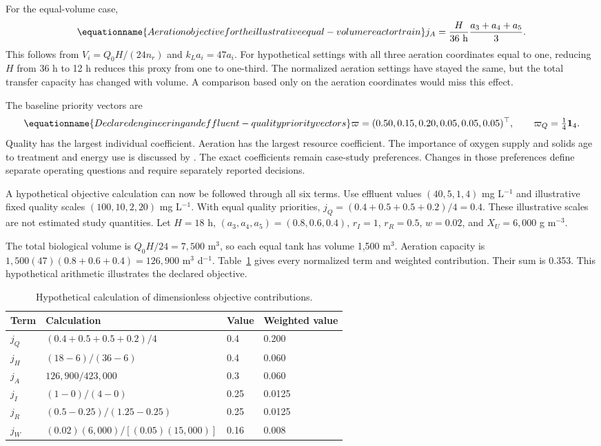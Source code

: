 For the equal-volume case,
\begin{equation}
\equationname{Aeration objective for the illustrative equal-volume reactor train}
j_A=\frac{H}{36\ \mathrm{h}}\frac{a_3+a_4+a_5}{3}.
\label{eq:plant_aeration_proxy_example}
\end{equation}
This follows from $V_i=Q_0H/(24n_r)$ and $k_La_i=47a_i$. For hypothetical settings with all three aeration coordinates equal to one, reducing $H$ from 36 h to 12 h reduces this proxy from one to one-third. The normalized aeration settings have stayed the same, but the total transfer capacity has changed with volume. A comparison based only on the aeration coordinates would miss this effect.

The baseline priority vectors are
\begin{equation}
\equationname{Declared engineering and effluent-quality priority vectors}
\varpi=(0.50,0.15,0.20,0.05,0.05,0.05)^\top,\qquad
\varpi_Q=\tfrac14\mathbf1_4.
\label{eq:plant_objective_priorities}
\end{equation}
Quality has the largest individual coefficient. Aeration has the largest resource coefficient. The importance of oxygen supply and solids age to treatment and energy use is discussed by \citet{Leu2012}. The exact coefficients remain case-study preferences. Changes in those preferences define separate operating questions and require separately reported decisions.

A hypothetical objective calculation can now be followed through all six terms. Use effluent values $(40,5,1,4)$ mg L$^{-1}$ and illustrative fixed quality scales $(100,10,2,20)$ mg L$^{-1}$. With equal quality priorities, $j_Q=(0.4+0.5+0.5+0.2)/4=0.4$. These illustrative scales are not estimated study quantities. Let $H=18$ h, $(a_3,a_4,a_5)=(0.8,0.6,0.4)$, $r_I=1$, $r_R=0.5$, $w=0.02$, and $X_U=6{,}000$ g m$^{-3}$.

The total biological volume is $Q_0H/24=7{,}500$ m$^3$, so each equal tank has volume 1{,}500 m$^3$. Aeration capacity is $1{,}500(47)(0.8+0.6+0.4)=126{,}900$ m$^3$ d$^{-1}$. Table~\ref{tab:plant_hypothetical_objective} gives every normalized term and weighted contribution. Their sum is 0.353. This hypothetical arithmetic illustrates the declared objective.

\begin{table}[htbp]
\centering\small
\caption{Hypothetical calculation of dimensionless objective contributions.}
\label{tab:plant_hypothetical_objective}
\begin{tabular}{llll}
\toprule Term & Calculation & Value & Weighted value\\\midrule
$j_Q$ & $(0.4+0.5+0.5+0.2)/4$ & 0.4 & 0.200\\
$j_H$ & $(18-6)/(36-6)$ & 0.4 & 0.060\\
$j_A$ & $126{,}900/423{,}000$ & 0.3 & 0.060\\
$j_I$ & $(1-0)/(4-0)$ & 0.25 & 0.0125\\
$j_R$ & $(0.5-0.25)/(1.25-0.25)$ & 0.25 & 0.0125\\
$j_W$ & $(0.02)(6{,}000)/[(0.05)(15{,}000)]$ & 0.16 & 0.008\\
\bottomrule
\end{tabular}
\end{table}

